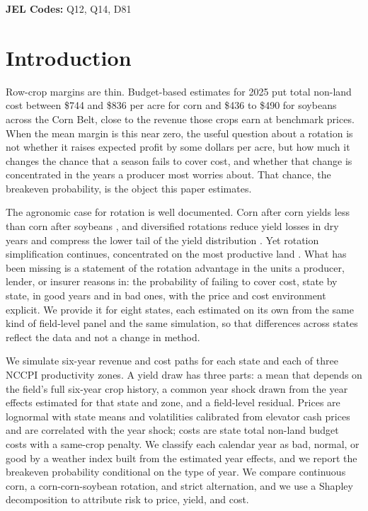 \documentclass[11pt,letterpaper]{article}
\theoremstyle{remark}
\begin{document}
\noindent\textbf{JEL Codes:} Q12, Q14, D81

\clearpage

\section{\label{sec:introduction}Introduction}

Row-crop margins are thin. Budget-based estimates for 2025 put total non-land cost between \$744 and \$836 per acre for corn and \$436 to \$490 for soybeans across the Corn Belt, close to the revenue those crops earn at benchmark prices. When the mean margin is this near zero, the useful question about a rotation is not whether it raises expected profit by some dollars per acre, but how much it changes the chance that a season fails to cover cost, and whether that change is concentrated in the years a producer most worries about. That chance, the breakeven probability, is the object this paper estimates.

The agronomic case for rotation is well documented. Corn after corn yields less than corn after soybeans \citep{Bullock1992, Seifert2017}, and diversified rotations reduce yield losses in dry years and compress the lower tail of the yield distribution \citep{Bowles2020, Smith2023}. Yet rotation simplification continues, concentrated on the most productive land \citep{socolar2021}. What has been missing is a statement of the rotation advantage in the units a producer, lender, or insurer reasons in: the probability of failing to cover cost, state by state, in good years and in bad ones, with the price and cost environment explicit. We provide it for eight states, each estimated on its own from the same kind of field-level panel and the same simulation, so that differences across states reflect the data and not a change in method.

We simulate six-year revenue and cost paths for each state and each of three NCCPI productivity zones. A yield draw has three parts: a mean that depends on the field's full six-year crop history, a common year shock drawn from the year effects estimated for that state and zone, and a field-level residual. Prices are lognormal with state means and volatilities calibrated from elevator cash prices and are correlated with the year shock; costs are state total non-land budget costs with a same-crop penalty. We classify each calendar year as bad, normal, or good by a weather index built from the estimated year effects, and we report the breakeven probability conditional on the type of year. We compare continuous corn, a corn-corn-soybean rotation, and strict alternation, and we use a Shapley decomposition to attribute risk to price, yield, and cost.
\end{document}
